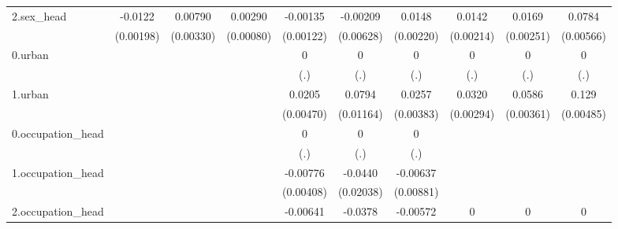 \begin{table}[htbp]
\begin{tabular}{l*{9}{c}}
2.sex\_head  &     -0.0122\sym{***}&     0.00790\sym{**} &     0.00290\sym{***}&    -0.00135         &    -0.00209         &      0.0148\sym{***}&      0.0142\sym{***}&      0.0169\sym{***}&      0.0784\sym{***}\\
            &   (0.00198)         &   (0.00330)         &   (0.00080)         &   (0.00122)         &   (0.00628)         &   (0.00220)         &   (0.00214)         &   (0.00251)         &   (0.00566)         \\
0.urban     &                     &                     &                     &           0         &           0         &           0         &           0         &           0         &           0         \\
            &                     &                     &                     &         (.)         &         (.)         &         (.)         &         (.)         &         (.)         &         (.)         \\
1.urban     &                     &                     &                     &      0.0205\sym{***}&      0.0794\sym{***}&      0.0257\sym{***}&      0.0320\sym{***}&      0.0586\sym{***}&       0.129\sym{***}\\
            &                     &                     &                     &   (0.00470)         &   (0.01164)         &   (0.00383)         &   (0.00294)         &   (0.00361)         &   (0.00485)         \\
0.occupation\_head&                     &                     &                     &           0         &           0         &           0         &                     &                     &                     \\
            &                     &                     &                     &         (.)         &         (.)         &         (.)         &                     &                     &                     \\
1.occupation\_head&                     &                     &                     &    -0.00776\sym{*}  &     -0.0440\sym{**} &    -0.00637         &                     &                     &                     \\
            &                     &                     &                     &   (0.00408)         &   (0.02038)         &   (0.00881)         &                     &                     &                     \\
2.occupation\_head&                     &                     &                     &    -0.00641\sym{***}&     -0.0378\sym{***}&    -0.00572\sym{*}  &           0         &           0         &           0         \\

\end{tabular}
\end{table}
